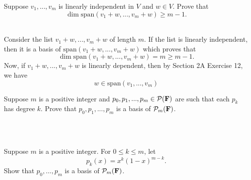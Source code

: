\begin{exercise}
    Suppose $v_1, ..., v_m$ is linearly independent in $V$ and $w \in V$. Prove that
    $$\dim \text{span}(v_1 + w, ..., v_m + w) \geq m-1.$$
\end{exercise}

\begin{solution}
    \\ Consider the list $v_1 + w, ..., v_m + w$ of length $m$. If the list is linearly independent, then it is a basis of $\text{span}(v_1 + w, ..., v_m + w)$ which proves that 
    $$\dim \text{span}(v_1 + w, ..., v_m + w) = m \geq m-1.$$
    Now, if $v_1 + w, ..., v_m + w$ is linearly dependent, then by Section 2A Exercise 12, we have 
    $$w \in \text{span}(v_1, ..., v_m) $$
\end{solution}

\begin{exercise}
    Suppose $m$ is a positive integer and $p_0, p_1, ..., p_m \in \mathcal{P}(\mathbf{F})$ are such that each $p_k$ has degree $k$. Prove that $p_0, p_1, ..., p_m$ is a basis of $\mathcal{P}_m(\mathbf{F})$.\\
\end{exercise}

\begin{solution}
    \\ \td \\
\end{solution}

\begin{exercise}
    Suppose $m$ is a positive integer. For $0 \leq k \leq m$, let 
    $$p_k(x) = x^k(1-x)^{m-k}.$$
    Show that $p_0, ..., p_m$ is a basis of $\mathcal{P}_m(\mathbf{F})$.\\
\end{exercise}

\begin{solution}
    \\ \td \\
\end{solution}